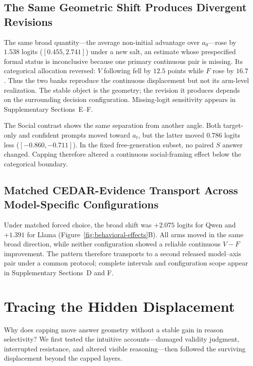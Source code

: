 \documentclass[letterpaper]{article} %
\begin{document}
\subsection{The Same Geometric Shift Produces Divergent Revisions}

The same broad quantity---the average non-initial advantage over $a_0$---rose by $1.538$ logits ($[0.455,2.741]$) under a new salt, an estimate whose prespecified formal status is inconclusive because one primary continuous pair is missing. Its categorical allocation reversed: $V$ following fell by $12.5$ points while $F$ rose by $16.7$. Thus the two banks reproduce the continuous displacement but not its arm-level realization. The stable object is the geometry; the revision it produces depends on the surrounding decision configuration. Missing-logit sensitivity appears in Supplementary Sections~E--F.

The Social contrast shows the same separation from another angle. Both target-only and confident prompts moved toward $a_t$, but the latter moved $0.786$ logits less ($[-0.860,-0.711]$). In the fixed free-generation subset, no paired $S$ answer changed. Capping therefore altered a continuous social-framing effect below the categorical boundary.

\subsection{Matched CEDAR-Evidence Transport Across Model-Specific Configurations}

Under matched forced choice, the broad shift was $+2.075$ logits for Qwen and $+1.391$ for Llama (Figure~\ref{fig:behavioral-effects}B). All arms moved in the same broad direction, while neither configuration showed a reliable continuous $V-F$ improvement. The pattern therefore transports to a second released model--axis pair under a common protocol; complete intervals and configuration scope appear in Supplementary Sections~D and F.

\section{Tracing the Hidden Displacement}
\label{sec:diagnosis}

Why does capping move answer geometry without a stable gain in reason selectivity? We first tested the intuitive accounts---damaged validity judgment, interrupted resistance, and altered visible reasoning---then followed the surviving displacement beyond the capped layers.
\end{document}
